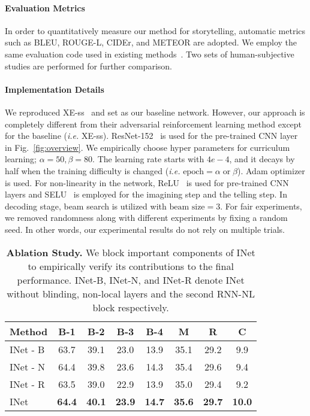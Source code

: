 \documentclass[letterpaper]{article} \usepackage{aaai20}  \usepackage{times}  \usepackage{helvet} \usepackage{courier}  \usepackage[hyphens]{url}  \usepackage{graphicx} \urlstyle{rm} \def\UrlFont{\rm}  \usepackage{graphicx}  \frenchspacing  \setlength{\pdfpagewidth}{8.5in}  \setlength{\pdfpageheight}{11in}
\newcommand{\figref}[1]{Fig.~\ref{#1}}
\newcommand{\ie}{{\it i.e. }}
\begin{document}
\paragraph{Evaluation Metrics}
\quad

\noindent
In order to quantitatively measure our method for storytelling, automatic metrics such as BLEU, ROUGE-L, CIDEr, and METEOR are adopted. We employ the same evaluation code used in existing methods~\cite{yu2017hierarchically,wang2018no}. Two sets of human-subjective studies are performed for further comparison.



\paragraph{Implementation Details}
\quad

\noindent
We reproduced XE-ss~\cite{wang2018no} and set as our baseline network. However, our approach is completely different from their adversarial reinforcement learning method except for the baseline (\ie XE-ss). ResNet-152~\cite{he2016deep} is used for the pre-trained CNN layer in \figref{fig:overview}. We empirically choose hyper parameters for curriculum learning; $\alpha = 50, \beta = 80$. The learning rate starts with $4e-4$, and it decays by half when the training difficulty is changed (\ie $\text{epoch} = \alpha \; \text{or} \; \beta$). Adam optimizer is used. For non-linearity in the network, ReLU~\cite{nair2010rectified} is used for pre-trained CNN layers and SELU~\cite{klambauer2017self} is employed for the imagining step and the telling step. In decoding stage, beam search is utilized with $\text{beam size}=3$. For fair experiments, we removed randomness along with different experiments by fixing a random seed. In other words, our experimental results do not rely on multiple trials. 

\begin{table}
\centering
\resizebox{1.0\linewidth}{!}
{\begin{tabular}{ l | c  c  c  c  c  c  c}
\hline
Method & B-1 & B-2 & B-3 & B-4 & M & R & C    \\
\hline
\hline
INet - B        & 63.7 & 39.1 & 23.0 & 13.9 & 35.1 & 29.2 & 9.9  \\
INet - N        & 64.4 & 39.8 & 23.6 & 14.3 & 35.4 & 29.6 & 9.4  \\
INet - R        & 63.5 & 39.0 & 22.9 & 13.9 & 35.0 & 29.4 & 9.2  \\
\hline
INet         & \textbf{64.4} & \textbf{40.1} & \textbf{23.9} & \textbf{14.7} & \textbf{35.6} & \textbf{29.7} & \textbf{10.0}  \\
\hline
\end{tabular}
}
\caption{\textbf{Ablation Study.} We block important components of INet to empirically verify its contributions to the final performance. INet-B, INet-N, and INet-R denote INet without blinding, non-local layers and the second RNN-NL block respectively.}
\label{tab:ablation}
\end{table}
\end{document}

